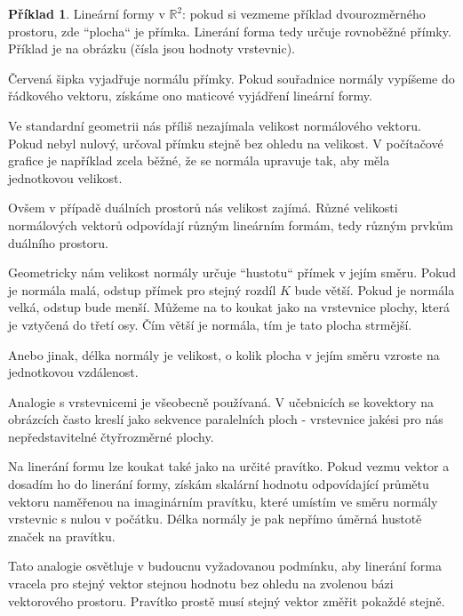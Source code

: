 \documentclass[a5paper,12pt]{amsbook}
\theoremstyle{definition}
\newtheorem{example}{Příklad}[chapter]
\begin{document}
\begin{example}\label{example:linforma1}Lineární formy v $\mathbb{R}^2$: pokud si vezmeme příklad
dvourozměrného prostoru, zde ``plocha`` je přímka. Linerání forma tedy určuje rovnoběžné přímky.
Příklad je na obrázku (čísla jsou hodnoty vrstevnic).
\begin{center}

\end{center}
Červená šipka vyjadřuje normálu přímky. Pokud souřadnice normály vypíšeme do řádkového
vektoru, získáme ono maticové vyjádření lineární formy.

Ve standardní geometrii nás příliš nezajímala velikost normálového vektoru. Pokud nebyl nulový, určoval
přímku stejně bez ohledu na velikost. V počítačové grafice je například zcela běžné, že se normála
upravuje tak, aby měla jednotkovou velikost.

Ovšem v případě duálních prostorů nás velikost zajímá. Různé velikosti normálových vektorů odpovídají
různým lineárním formám, tedy různým prvkům duálního prostoru.

Geometricky nám velikost normály určuje ``hustotu`` přímek v jejím směru. Pokud je normála malá,
odstup přímek pro stejný rozdíl $K$ bude větší. Pokud je normála velká, odstup bude menší. Můžeme
na to koukat jako na vrstevnice plochy, která je vztyčená do třetí osy. Čím větší je normála, tím
je tato plocha strmější.

Anebo jinak, délka normály je velikost, o kolik plocha v jejím směru vzroste na jednotkovou
vzdálenost.

Analogie s vrstevnicemi je všeobecně používaná. V učebnicích se kovektory na obrázcích často kreslí
jako sekvence paralelních ploch - vrstevnice jakési pro nás nepředstavitelné čtyřrozměrné plochy.

\medskip\noindent
Na linerání formu lze koukat také jako na určité pravítko. Pokud vezmu vektor a dosadím ho do linerání
formy, získám skalární hodnotu odpovídající průmětu vektoru naměřenou na imaginárním pravítku, které
umístím ve směru normály vrstevnic s nulou v počátku. Délka normály je pak nepřímo úměrná hustotě značek
na pravítku.

Tato analogie osvětluje v budoucnu vyžadovanou podmínku, aby linerání forma vracela pro stejný vektor
stejnou hodnotu bez ohledu na zvolenou bázi vektorového prostoru. Pravítko prostě musí stejný vektor
změřit pokaždé stejně.

\end{example}
\end{document}
